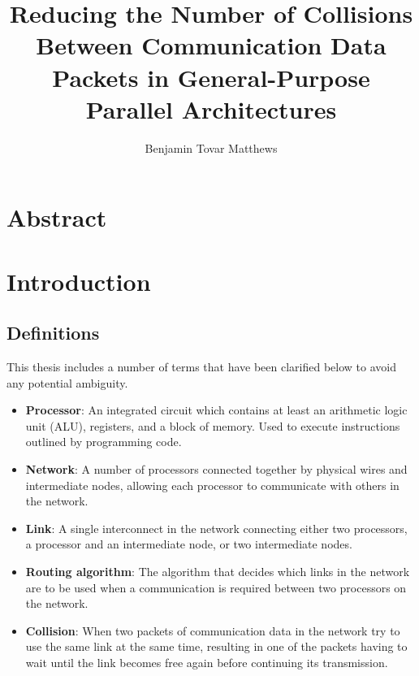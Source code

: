 \documentclass[a4paper, 12pt]{article}
\title{Reducing the Number of Collisions Between Communication Data Packets in General-Purpose Parallel Architectures}
\author{Benjamin Tovar Matthews}
\begin{document}
\setcounter{page}{0}
\maketitle

\begin{abstract}

\end{abstract}

\thispagestyle{empty}
\newpage
{}
\section*{Abstract}



\newpage
\setcounter{tocdepth}{2}
\tableofcontents
\newpage
\listoffigures

\newpage
\section{Introduction}

\subsection{Definitions}

This thesis includes a number of terms that have been clarified below to avoid any potential ambiguity.
\begin{itemize}[leftmargin=0cm]

\item[] \textbf{Processor}: An integrated circuit which contains at least an arithmetic logic unit (ALU), registers, and a block of memory. Used to execute instructions outlined by programming code.

\item[] \textbf{Network}: A number of processors connected together by physical wires and intermediate nodes, allowing each processor to communicate with others in the network.

\item[] \textbf{Link}: A single interconnect in the network connecting either two processors, a processor and an intermediate node, or two intermediate nodes.

\item[] \textbf{Routing algorithm}: The algorithm that decides which links in the network are to be used when a communication is required between two processors on the network.

\item[] \textbf{Collision}: When two packets of communication data in the network try to use the same link at the same time, resulting in one of the packets having to wait until the link becomes free again before continuing its transmission.

\end{itemize}
\end{document}
